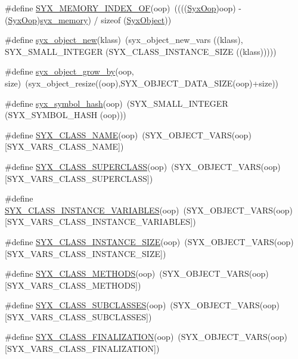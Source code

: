 \begin{CompactItemize}
\item 
\#define \hyperlink{syx-object_8h_2e720b85b8f2836a8326cd03674c3977}{SYX\_\-MEMORY\_\-INDEX\_\-OF}(oop)~((((\hyperlink{syx-types_8h_1121caba2d40b2ce090b640762744ccd}{SyxOop})oop) - (\hyperlink{syx-types_8h_1121caba2d40b2ce090b640762744ccd}{SyxOop})\hyperlink{syx-object_8h_596eb1af08585a501808735d80503037}{syx\_\-memory}) / sizeof (\hyperlink{struct_syx_object}{SyxObject}))
\item 
\#define \hyperlink{syx-object_8h_a3c2d59b7296539517361dea284a0db7}{syx\_\-object\_\-new}(klass)~(syx\_\-object\_\-new\_\-vars ((klass), SYX\_\-SMALL\_\-INTEGER (SYX\_\-CLASS\_\-INSTANCE\_\-SIZE ((klass)))))
\item 
\#define \hyperlink{syx-object_8h_e164aa1036bfcc0f7e63e2f8e81c0f54}{syx\_\-object\_\-grow\_\-by}(oop, size)~(syx\_\-object\_\-resize((oop),SYX\_\-OBJECT\_\-DATA\_\-SIZE(oop)+size))
\item 
\#define \hyperlink{syx-object_8h_c3fb81a62dd8c0a741b3f78b0330f784}{syx\_\-symbol\_\-hash}(oop)~(SYX\_\-SMALL\_\-INTEGER (SYX\_\-SYMBOL\_\-HASH (oop)))
\item 
\#define \hyperlink{syx-object_8h_d772af235c9512a18d5cbb8e9d0bb022}{SYX\_\-CLASS\_\-NAME}(oop)~(SYX\_\-OBJECT\_\-VARS(oop)\mbox{[}SYX\_\-VARS\_\-CLASS\_\-NAME\mbox{]})
\item 
\#define \hyperlink{syx-object_8h_5307ee0e36a40bca0cc49aec373c4232}{SYX\_\-CLASS\_\-SUPERCLASS}(oop)~(SYX\_\-OBJECT\_\-VARS(oop)\mbox{[}SYX\_\-VARS\_\-CLASS\_\-SUPERCLASS\mbox{]})
\item 
\#define \hyperlink{syx-object_8h_57d3cc59dce77ddc68722cc919477a1e}{SYX\_\-CLASS\_\-INSTANCE\_\-VARIABLES}(oop)~(SYX\_\-OBJECT\_\-VARS(oop)\mbox{[}SYX\_\-VARS\_\-CLASS\_\-INSTANCE\_\-VARIABLES\mbox{]})
\item 
\#define \hyperlink{syx-object_8h_1fdb5e90c4eb0bca307b103320486ccb}{SYX\_\-CLASS\_\-INSTANCE\_\-SIZE}(oop)~(SYX\_\-OBJECT\_\-VARS(oop)\mbox{[}SYX\_\-VARS\_\-CLASS\_\-INSTANCE\_\-SIZE\mbox{]})
\item 
\#define \hyperlink{syx-object_8h_aa27d87840f036f2211dbe589cdb712d}{SYX\_\-CLASS\_\-METHODS}(oop)~(SYX\_\-OBJECT\_\-VARS(oop)\mbox{[}SYX\_\-VARS\_\-CLASS\_\-METHODS\mbox{]})
\item 
\#define \hyperlink{syx-object_8h_a31a4efab7eb3f8fa35c78e9d9230102}{SYX\_\-CLASS\_\-SUBCLASSES}(oop)~(SYX\_\-OBJECT\_\-VARS(oop)\mbox{[}SYX\_\-VARS\_\-CLASS\_\-SUBCLASSES\mbox{]})
\item 
\#define \hyperlink{syx-object_8h_fc8cf8d7967541cd3bc7c5e15cbb33ea}{SYX\_\-CLASS\_\-FINALIZATION}(oop)~(SYX\_\-OBJECT\_\-VARS(oop)\mbox{[}SYX\_\-VARS\_\-CLASS\_\-FINALIZATION\mbox{]})

\end{CompactItemize}
